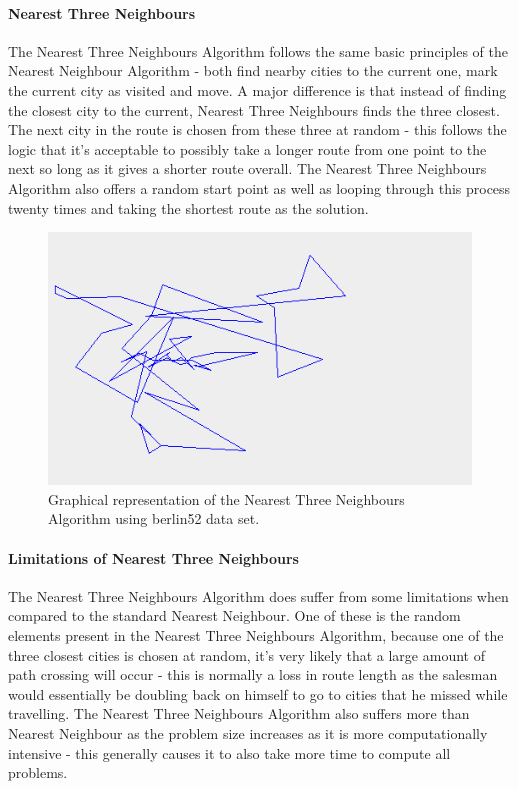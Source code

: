 \documentclass[conference,backref=page]{acmsiggraph}
\begin{document}
\paragraph{Nearest Three Neighbours}
The Nearest Three Neighbours Algorithm follows the same basic principles of the Nearest Neighbour Algorithm - both find nearby cities to the current one, mark the current city as visited and move. A major difference is that instead of finding the closest city to the current, Nearest Three Neighbours finds the three closest. The next city in the route is chosen from these three at random - this follows the logic that it's acceptable to possibly take a longer route from one point to the next so long as it gives a shorter route overall. The Nearest Three Neighbours Algorithm also offers a random start point as well as looping through this process twenty times and taking the shortest route as the solution.

\begin{figure}[h]
	\centering
	\includegraphics[width=1.0\columnwidth]{images/nearestThreeNeighboursPath}
	\caption{Graphical representation of the Nearest Three Neighbours Algorithm using berlin52 data set.}
\end{figure}

\paragraph{Limitations of Nearest Three Neighbours}
The Nearest Three Neighbours Algorithm does suffer from some limitations when compared to the standard Nearest Neighbour. One of these is the random elements present in the Nearest Three Neighbours Algorithm, because one of the three closest cities is chosen at random, it's very likely that a large amount of path crossing will occur - this is normally a loss in route length as the salesman would essentially be doubling back on himself to go to cities that he missed while travelling.  The Nearest Three Neighbours Algorithm also suffers more than Nearest Neighbour as the problem size increases as it is more computationally intensive - this generally causes it to also take more time to compute all problems. 
\end{document}
